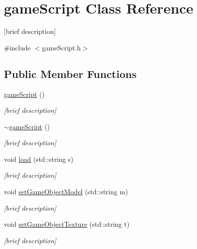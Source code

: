 \hypertarget{classgame_script}{\section{game\-Script Class Reference}
\label{classgame_script}
}


\mbox{[}brief description\mbox{]}  




{\ttfamily \#include $<$game\-Script.\-h$>$}

\subsection*{Public Member Functions}
\begin{DoxyCompactItemize}
\item 
\hyperlink{classgame_script_a4b7db6239f0f67241c30daa8414d1d9e}{game\-Script} ()
\begin{DoxyCompactList}\small\item\em \mbox{[}brief description\mbox{]} \end{DoxyCompactList}\item 
\hyperlink{classgame_script_a52e0351cd1e828cf549fbed62d7bdcf7}{$\sim$game\-Script} ()
\begin{DoxyCompactList}\small\item\em \mbox{[}brief description\mbox{]} \end{DoxyCompactList}\item 
void \hyperlink{classgame_script_aeae2f89baeb2dcaab2b32bcf3e3b014d}{load} (std\-::string s)
\begin{DoxyCompactList}\small\item\em \mbox{[}brief description\mbox{]} \end{DoxyCompactList}\item 
void \hyperlink{classgame_script_a68e6a773eda1ad1aabb05563d7c93630}{set\-Game\-Object\-Model} (std\-::string m)
\begin{DoxyCompactList}\small\item\em \mbox{[}brief description\mbox{]} \end{DoxyCompactList}\item 
void \hyperlink{classgame_script_af3da551944c8832789b779a9c6871590}{set\-Game\-Object\-Texture} (std\-::string t)
\begin{DoxyCompactList}\small\item\em \mbox{[}brief description\mbox{]} \end{DoxyCompactList}\item 

\end{DoxyCompactItemize}
